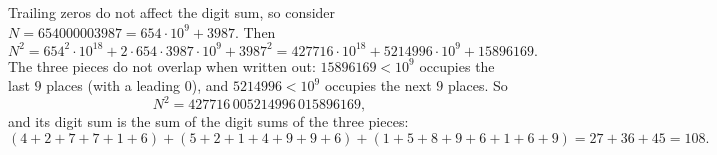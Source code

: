 Trailing zeros do not affect the digit sum, so consider $N=654000003987=654\cdot10^9+3987$. Then
\[
N^2=654^2\cdot10^{18}+2\cdot654\cdot3987\cdot10^9+3987^2=427716\cdot10^{18}+5214996\cdot10^{9}+15896169 .
\]
The three pieces do not overlap when written out: $15896169<10^9$ occupies the last $9$ places (with a leading $0$), and $5214996<10^9$ occupies the next $9$ places. So
\[
N^2=427716\,005214996\,015896169,
\]
and its digit sum is the sum of the digit sums of the three pieces:
\[
(4+2+7+7+1+6)+(5+2+1+4+9+9+6)+(1+5+8+9+6+1+6+9)=27+36+45=\boxed{108}.
\]
